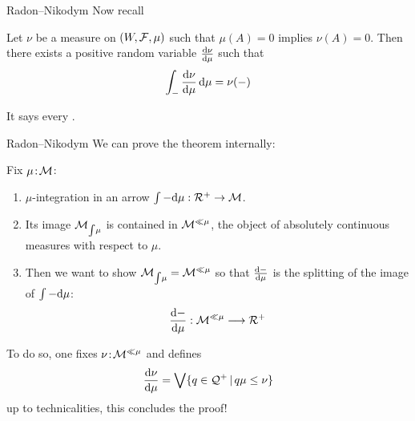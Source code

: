 \begin{frame}{Radon--Nikodym}
	Now recall

	\vfill
	\begin{theorem}
		Let $\nu$ be a measure on $(W, \mathcal{F}, \mu)$ such that $\mu(A) = 0$ implies $\nu(A) = 0$.
		Then there exists a positive random variable $\frac{\mathrm{d}{\nu}}{\mathrm{d}{\mu}}$ such that
		\begin{equation*}
			\int_{-} \frac{\mathrm{d}{\nu}}{\mathrm{d}{\mu}} \, \mathrm{d} \mu = \nu(-)
		\end{equation*}
	\end{theorem}

	\vfill
	It says every .
\end{frame}

\begin{frame}{Radon--Nikodym}
	We can prove the theorem internally:

	\vfill
	Fix $\mu \!:\! \mathcal{M}$:
	\begin{enumerate}
		\item $\mu$-integration in an arrow $\int - \mathrm{d} \mu : \mathcal{R}^+ \to \mathcal{M}$.
		\item Its image $\mathcal{M}_{\int\!\mu}$ is contained in $\mathcal{M}^{\ll \mu}$, the object of absolutely continuous measures with respect to $\mu$.
		\item Then we want to show $\mathcal{M}_{\int\!\mu} = \mathcal{M}^{\ll \mu}$ so that $\frac{\mathrm{d}{-}}{\mathrm{d}{\mu}}$ is the splitting of the image of $\int - \mathrm{d} \mu$:
		\begin{equation*}
			\frac{\mathrm{d}{-}}{\mathrm{d}{\mu}} : \mathcal{M}^{\ll \mu} \longrightarrow \mathcal{R}^+
		\end{equation*}
	\end{enumerate}

	\vfill
	To do so, one fixes $\nu \!:\! \mathcal{M}^{\ll \mu}$ and defines
	\begin{equation*}
		\frac{\mathrm{d}{\nu}}{\mathrm{d}{\mu}} = \bigvee \{q \in \mathcal{Q}^+ \,|\, q \mu \leq \nu\}
	\end{equation*}
	up to technicalities, this concludes the proof!
\end{frame}

